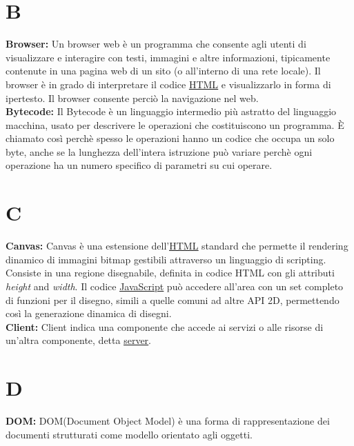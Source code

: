 \section*{B}
\hypertarget{browser}{}
\textbf{Browser:}
Un browser web \` e un programma che consente agli utenti di visualizzare e interagire con testi, immagini e altre informazioni, tipicamente contenute in una pagina web di un sito (o all'interno di una rete locale).
Il browser \` e in grado di interpretare il codice \hyperlink{html}{\underline{HTML}} e visualizzarlo in forma di ipertesto. Il browser consente perci\` o la navigazione nel web.\\

\hypertarget{bytecode}{}
\textbf{Bytecode:}
Il Bytecode \` e un linguaggio intermedio pi\` u astratto del linguaggio macchina, usato per descrivere le operazioni che costituiscono un programma. \` E chiamato cos\` i perch\` e spesso le operazioni hanno un codice che occupa un solo byte, anche se la lunghezza dell'intera istruzione pu\` o variare perch\` e ogni operazione ha un numero specifico di parametri su cui operare.\\

\section*{C}
\hypertarget{canvas}{}
\textbf{Canvas:}
Canvas \` e una estensione dell'\hyperlink{html}{\underline{HTML}} standard che permette il rendering dinamico di immagini bitmap gestibili attraverso un linguaggio di scripting.  Consiste in una regione disegnabile, definita in codice HTML con gli attributi \textit{height} and \textit{width}. Il codice \hyperlink{javascript}{\underline{JavaScript}} pu\`o accedere all'area con un set completo di funzioni per il disegno, simili a quelle comuni ad altre API 2D, permettendo cos\`i la generazione dinamica di disegni.\\

\hypertarget{client}{}
\textbf{Client:}
Client indica una componente che accede ai servizi o alle risorse di un'altra componente, detta \hyperlink{server}{\underline{server}}.\\

\section*{D}
\hypertarget{dom}{}
\textbf{DOM:}
DOM(Document Object Model) \` e una forma di rappresentazione dei documenti strutturati come modello orientato agli oggetti.\\

